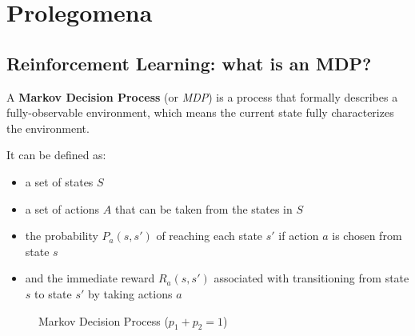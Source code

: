\chapter{Prolegomena}
\label{chap:prolegomena}

\section{Reinforcement Learning: what is an MDP?}

A \textbf{Markov Decision Process} \cite{mdp} (or \textit{MDP}) is a process that formally describes a fully-observable environment, which means the current state fully characterizes the environment. 

It can be defined as:

\begin{itemize}
    \item a set of states $S$
    \item a set of actions $A$ that can be taken from the states in $S$
    \item the probability $P_a(s, s')$ of reaching each state $s'$ if action $a$ is chosen from state $s$
    \item and the immediate reward $R_a(s, s')$ associated with transitioning from state $s$ to state $s'$ by taking actions $a$
\end{itemize}
      
\begin{figure}[H]
    \centering
  
    \caption{Markov Decision Process ($p_1 + p_2 = 1$)}
    \label{fig:my_label}
\end{figure}

